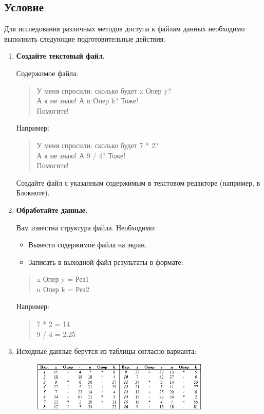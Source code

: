 \documentclass[14pt,a4paper]{article}
\begin{document}
\subsection{Условие}
Для исследования различных методов доступа к файлам данных необходимо выполнить следующие подготовительные действия:

\begin{enumerate}
  \item \textbf{Создайте текстовый файл.}

    Содержимое файла:
    \begin{quote}
      У меня спросили: сколько будет x Опер y?\\
      А я не знаю! А n Опер k? Тоже!\\
      Помогите!
    \end{quote}
    Например:
    \begin{quote}
      У меня спросили: сколько будет 7 * 2?\\
      А я не знаю! А 9 / 4? Тоже!\\
      Помогите!
    \end{quote}
    Создайте файл с указанным содержимым в текстовом редакторе (например, в Блокноте).

  \item \textbf{Обработайте данные.}

    Вам известна структура файла. Необходимо:
    \begin{itemize}
      \item Вывести содержимое файла на экран.
      \item Записать в выходной файл результаты в формате:
    \end{itemize}
    \begin{quote}
      x Опер y = Рез1\\
      n Опер k = Рез2
    \end{quote}
    Например:
    \begin{quote}
      7 * 2 = 14\\
      9 / 4 = 2.25
    \end{quote}
  \item Исходные данные берутся из таблицы согласно варианта:
    \begin{figure}[h]
      \centering
      \includegraphics[width=0.8\textwidth]{data/condition15_1.png} %
    \end{figure}
\end{enumerate}
\end{document}
